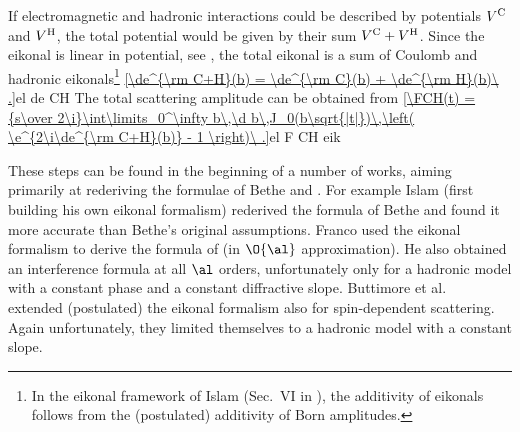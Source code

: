 
If electromagnetic and hadronic interactions could be described by potentials $V^{\rm C}$ and $V^{\rm H}$, the total potential would be given by their sum $V^{\rm C} + V^{\rm H}$. Since the eikonal is linear in potential, see , the total eikonal is a sum of Coulomb and hadronic eikonals\footnote{%
In the eikonal framework of Islam (Sec.~VI in ), the additivity of eikonals follows from the (postulated) additivity of Born amplitudes.
}
\eqref{\de^{\rm C+H}(b) = \de^{\rm C}(b) + \de^{\rm H}(b)\ .}{el de CH}
The total scattering amplitude can be obtained from 
\eqref{\FCH(t) = {s\over 2\i}\int\limits_0^\infty b\,\d b\,J_0(b\sqrt{|t|})\,\left( \e^{2\i\de^{\rm C+H}(b)} - 1 \right)\ .}{el F CH eik}

These steps can be found in the beginning of a number of works, aiming primarily at rederiving the formulae of Bethe  and \WY{} .
  For example Islam  (first building his own eikonal formalism) rederived the formula of Bethe and found it more accurate than Bethe's original assumptions.
  Franco  used the eikonal formalism to derive the formula of \WY{} (in $\O{\al}$ approximation). He also obtained an interference formula at all $\al$ orders, unfortunately only for a hadronic model with a constant phase and a constant diffractive slope.
  Buttimore et al.~ extended (postulated) the eikonal formalism also for spin-dependent scattering. Again unfortunately, they limited themselves to a hadronic model with a constant slope.


